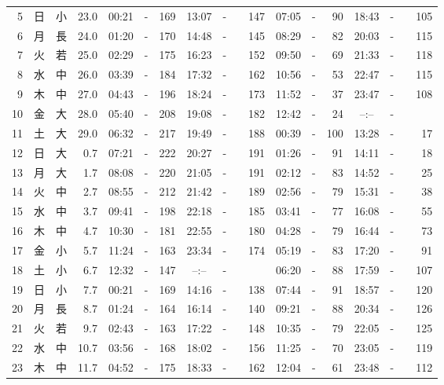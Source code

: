\documentclass[12pt.a4j]{jsarticle}
\begin{document}
\begin{center}
\begin{table}[ht]
\begin{tabular}{|rc|cr|ccrccr|ccrccr|}
 5 & 日 & 小 & 23.0 &  00:21 &-& 169  &  13:07 &-& 147  &   07:05 &-&  90  &   18:43 &-& 105  \\
 6 & 月 & 長 & 24.0 &  01:20 &-& 170  &  14:48 &-& 145  &   08:29 &-&  82  &   20:03 &-& 115  \\
 7 & 火 & 若 & 25.0 &  02:29 &-& 175  &  16:23 &-& 152  &   09:50 &-&  69  &   21:33 &-& 118  \\
 8 & 水 & 中 & 26.0 &  03:39 &-& 184  &  17:32 &-& 162  &   10:56 &-&  53  &   22:47 &-& 115  \\
 9 & 木 & 中 & 27.0 &  04:43 &-& 196  &  18:24 &-& 173  &   11:52 &-&  37  &   23:47 &-& 108  \\
10 & 金 & 大 & 28.0 &  05:40 &-& 208  &  19:08 &-& 182  &   12:42 &-&  24  &   --:-- &-&~~~~~ \\
11 & 土 & 大 & 29.0 &  06:32 &-& 217  &  19:49 &-& 188  &   00:39 &-& 100  &   13:28 &-&  17  \\
12 & 日 & 大 &  0.7 &  07:21 &-& 222  &  20:27 &-& 191  &   01:26 &-&  91  &   14:11 &-&  18  \\
13 & 月 & 大 &  1.7 &  08:08 &-& 220  &  21:05 &-& 191  &   02:12 &-&  83  &   14:52 &-&  25  \\
14 & 火 & 中 &  2.7 &  08:55 &-& 212  &  21:42 &-& 189  &   02:56 &-&  79  &   15:31 &-&  38  \\
15 & 水 & 中 &  3.7 &  09:41 &-& 198  &  22:18 &-& 185  &   03:41 &-&  77  &   16:08 &-&  55  \\
16 & 木 & 中 &  4.7 &  10:30 &-& 181  &  22:55 &-& 180  &   04:28 &-&  79  &   16:44 &-&  73  \\
17 & 金 & 小 &  5.7 &  11:24 &-& 163  &  23:34 &-& 174  &   05:19 &-&  83  &   17:20 &-&  91  \\
18 & 土 & 小 &  6.7 &  12:32 &-& 147  &  --:-- &-&~~~~~ &   06:20 &-&  88  &   17:59 &-& 107  \\
19 & 日 & 小 &  7.7 &  00:21 &-& 169  &  14:16 &-& 138  &   07:44 &-&  91  &   18:57 &-& 120  \\
20 & 月 & 長 &  8.7 &  01:24 &-& 164  &  16:14 &-& 140  &   09:21 &-&  88  &   20:34 &-& 126  \\
21 & 火 & 若 &  9.7 &  02:43 &-& 163  &  17:22 &-& 148  &   10:35 &-&  79  &   22:05 &-& 125  \\
22 & 水 & 中 & 10.7 &  03:56 &-& 168  &  18:02 &-& 156  &   11:25 &-&  70  &   23:05 &-& 119  \\
23 & 木 & 中 & 11.7 &  04:52 &-& 175  &  18:33 &-& 162  &   12:04 &-&  61  &   23:48 &-& 112  \\

\end{tabular}
\end{table}
\end{center}
\end{document}
